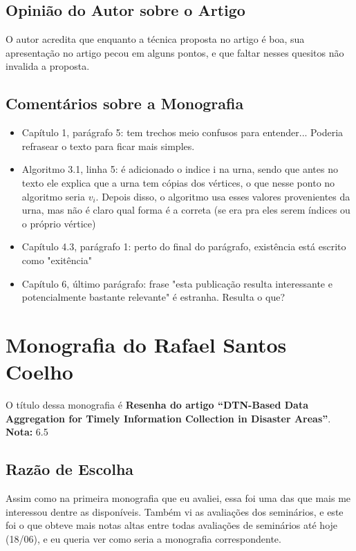 \subsection{Opinião do Autor sobre o Artigo}
O autor acredita que enquanto a técnica proposta no artigo é boa, sua apresentação no artigo pecou 
em alguns pontos, e que faltar nesses quesitos não invalida a proposta. 

\subsection{Comentários sobre a Monografia}
\begin{itemize}
  \item Capítulo 1, parágrafo 5: tem trechos meio confusos para entender... Poderia refrasear o texto 
para ficar mais simples.

  \item Algoritmo 3.1, linha 5: é adicionado o indice i na urna, sendo que antes no texto ele explica
que a urna tem cópias dos vértices, o que nesse ponto no algoritmo seria $v_{i}$.
Depois disso, o algoritmo usa esses valores provenientes da urna, mas não é claro
qual forma é a correta (se era pra eles serem índices ou o próprio vértice)

  \item Capítulo 4.3, parágrafo 1: perto do final do parágrafo, existência está escrito como "exitência"

  \item Capítulo 6, último parágrafo: frase "esta publicação resulta interessante e potencialmente
bastante relevante" é estranha. Resulta o que?
\end{itemize}


\pagebreak

\section{Monografia do Rafael Santos Coelho}
O título dessa monografia é \textbf{Resenha do artigo \textquotedblleft DTN-Based 
Data Aggregation for Timely Information Collection in Disaster Areas\textquotedblright }.\\

\textbf{Nota:} 6.5

\subsection{Razão de Escolha}
Assim como na primeira monografia que eu avaliei, essa foi uma das que mais me interessou dentre as disponíveis.
Também vi as avaliações dos seminários, e este foi o que obteve mais notas altas entre todas avaliações
de seminários até hoje (18/06), e eu queria ver como seria a monografia correspondente.

